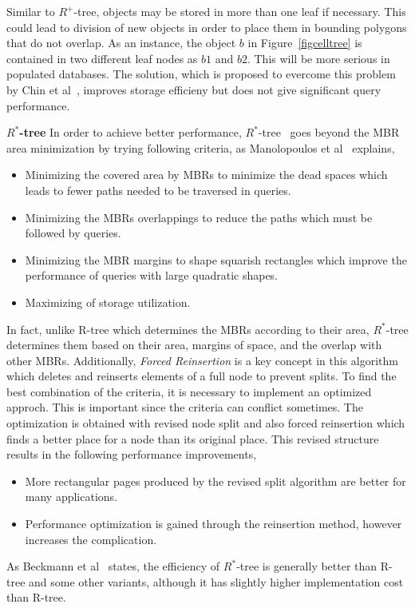 \documentclass[a4paper,12pt]{article}
\begin{document}
Similar to $R^+$-tree, objects may be stored in more than one leaf if necessary. This could lead to division of new objects in order to place them in bounding polygons that do not overlap. 
As an instance, the object $b$ in Figure~\ref{figcelltree} is contained in two different leaf nodes as $b1$ and $b2$.
This will be more serious in populated databases. The solution, which is proposed to evercome this problem by Chin et al~\cite{survey}, improves storage efficieny but does not give significant query performance. 

\textbf{$R^*$-tree}
In order to achieve better performance, $R^*$-tree~\cite{rstartree} goes beyond the MBR area minimization by trying following criteria, as Manolopoulos et al~\cite{Manolopoulos:2005} explains,
\begin{itemize}
\item Minimizing the covered area by MBRs to minimize the dead spaces which leads to fewer paths needed to be traversed in queries. 
\item Minimizing the MBRs overlappings to reduce the paths which must be followed by queries.
\item Minimizing the MBR margins to shape squarish rectangles which improve the performance of queries with large quadratic shapes.
\item Maximizing of storage utilization. 
\end{itemize}
In fact, unlike R-tree which determines the MBRs according to their area, $R^*$-tree determines them based on their area, margins of space, and the overlap with other MBRs. Additionally, \textit{Forced Reinsertion} is a key concept in this algorithm which deletes and reinserts elements of a full node to prevent splits.
To find the best combination of the criteria, it is necessary to implement an optimized approch. This is important since the criteria can conflict sometimes. The optimization is obtained with revised node split and also forced reinsertion which finds a better place for a node than its original place. This revised structure results in the following performance improvements,
\begin{itemize}
\item More rectangular pages produced by the revised split algorithm are better for many applications.
\item Performance optimization is gained through the reinsertion method, however increases the complication.
\end{itemize}
As Beckmann et al~\cite{rstartree} states, the efficiency of $R^*$-tree is generally better than R-tree and some other variants, although it has slightly higher implementation cost than R-tree.
\end{document}
